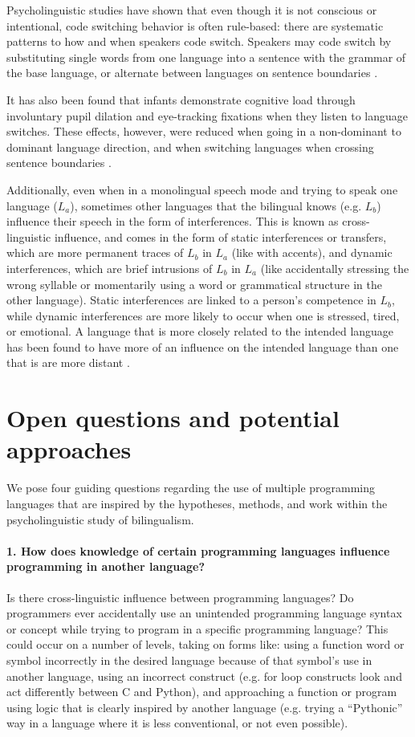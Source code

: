 \documentclass[a4paper,UKenglish,cleveref, autoref]{oasics-v2019}
\begin{document}
Psycholinguistic studies have shown that even though it is not conscious or intentional, code switching behavior is often rule-based: there are systematic patterns to how and when speakers code switch. Speakers may code switch by substituting single words from one language into a sentence with the grammar of the base language, or alternate between languages on sentence boundaries \cite{pl0034}.

It has also been found that infants demonstrate cognitive load through involuntary pupil dilation and eye-tracking fixations when they listen to language switches. These effects, however, were reduced when going in a non-dominant to dominant language direction, and when switching languages when crossing sentence boundaries \cite{pl0028}. 

Additionally, even when in a monolingual speech mode and trying to speak one language ($L_a$), sometimes other languages that the bilingual knows (e.g. $L_b$) influence their speech in the form of interferences. This is known as cross-linguistic influence, and comes in the form of static interferences or transfers, which are more permanent traces of $L_b$ in $L_a$ (like with accents), and dynamic interferences, which are brief intrusions of $L_b$ in $L_a$ (like accidentally stressing the wrong syllable or momentarily using a word or grammatical structure in the other language). Static interferences are linked to a person’s competence in $L_b$, while dynamic interferences are more likely to occur when one is stressed, tired, or emotional. A language that is more closely related to the intended language has been found to have more of an influence on the intended language than one that is are more distant \cite{pl0011}. 

\section{Open questions and potential approaches}
We pose four guiding questions regarding the use of multiple programming languages that are inspired by the hypotheses, methods, and work within the psycholinguistic study of bilingualism. 

\paragraph*{1. How does knowledge of certain programming languages influence programming in another language?}

Is there cross-linguistic influence \cite{pl0011} between programming languages? Do programmers ever accidentally use an unintended programming language syntax or concept while trying to program in a specific programming language? This could occur on a number of levels, taking on forms like: using a function word or symbol incorrectly in the desired language because of that symbol’s use in another language, using an incorrect construct (e.g. for loop constructs look and act differently between C and Python), and approaching a function or program using logic that is clearly inspired by another language (e.g. trying a “Pythonic” way in a language where it is less conventional, or not even possible). 
\end{document}
